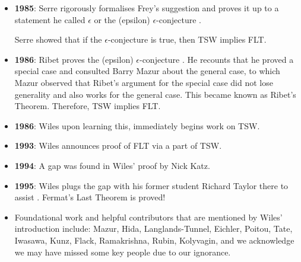 \documentclass{article}
\theoremstyle{definition}
\theoremstyle{definition}
\theoremstyle{definition}
\begin{document}
\begin{itemize}
\item \textbf{1985}: Serre rigorously formalises Frey's suggestion and proves it up to a statement he called $\epsilon$ or the (epsilon) $\epsilon$-conjecture \cite{Serre}. 

Serre showed that if the $\epsilon$-conjecture is true, then TSW implies FLT.




\item \textbf{1986}: Ribet proves the (epsilon) $\epsilon$-conjecture \cite{Ribet}. He recounts that he proved a special case and consulted Barry Mazur about the general case, to which Mazur observed that Ribet's argument for the special case did not lose generality and also works for the general case. This became known as Ribet's Theorem. Therefore, TSW implies FLT.





\item \textbf{1986}:
Wiles upon learning this, immediately begins work on TSW.

\item \textbf{1993}: Wiles announces proof of FLT via a part of TSW.

\item \textbf{1994}: A gap was found in Wiles' proof by Nick Katz.

\item \textbf{1995}:
Wiles plugs the gap with his former student Richard Taylor there to assist \cite{Wiles}. Fermat's Last Theorem is proved!


\item Foundational work and helpful contributors that are mentioned by Wiles' introduction \cite{Wiles} include:  Mazur, Hida, Langlands-Tunnel, Eichler, Poitou, Tate, Iwasawa, Kunz, Flack, Ramakrishna, Rubin, Kolyvagin, and we acknowledge we may have missed some key people due to our ignorance.


\end{itemize}
\end{document}
